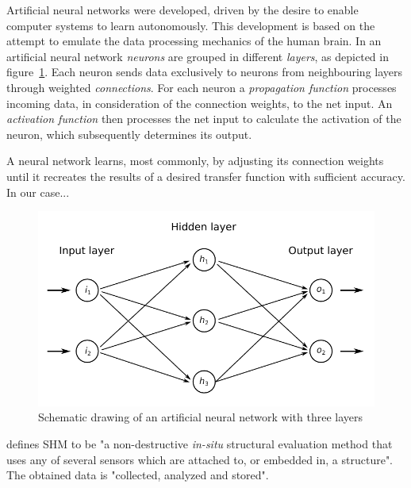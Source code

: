 \documentclass[12pt]{scrartcl}
\begin{document}
Artificial neural networks were developed, driven by the desire to enable computer systems to learn autonomously.
This development is based on the attempt to emulate the data processing mechanics of the human brain. %
In an artificial neural network \emph{neurons} are grouped in different \emph{layers}, as depicted in figure~\ref{fig:neuralnetwork}. 
Each neuron sends data exclusively to neurons from neighbouring layers through weighted \emph{connections}.
For each neuron a \emph{propagation function} processes incoming data, in consideration of the connection weights, to the net input.
An \emph{activation function} then processes the net input to calculate the activation of the neuron, which subsequently determines its output. \cite{KrieselNN}

A neural network learns, most commonly, by adjusting its connection weights until it recreates the results of a desired transfer function with sufficient accuracy.
In our case...

\begin{figure}[h]
    \centering
    \includegraphics{figures/neuralnetworks.pdf}
    \caption{Schematic drawing of an artificial neural network with three layers}
    \label{fig:neuralnetwork}
\end{figure}
\cite[4]{BisbySHM} defines SHM to be "a non-destructive \textit{in-situ} structural evaluation method that uses any of several sensors which are attached to, or embedded in, a structure". The obtained data is "collected, analyzed and stored".

\end{document}
